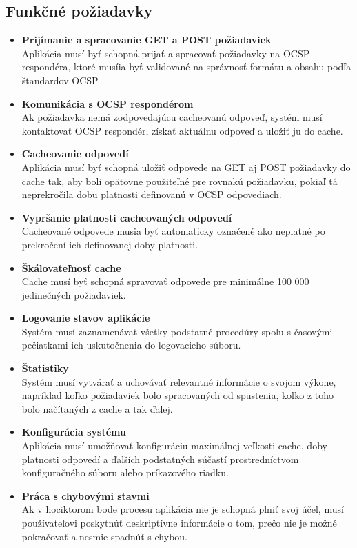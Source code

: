 \documentclass[12pt, twoside]{book}
\begin{document}
\subsection{Funkčné požiadavky}

\begin{itemize}
\item \textbf{Prijímanie a spracovanie  GET a POST požiadaviek} \\
Aplikácia  musí byť schopná prijať a spracovať požiadavky na OCSP respondéra, ktoré musíia byť validované na správnosť formátu a obsahu podľa štandardov OCSP. 

\item \textbf{Komunikácia s OCSP respondérom} \\
Ak požiadavka nemá zodpovedajúcu cacheovanú odpoveď, systém musí kontaktovať OCSP respondér, získať aktuálnu odpoveď a uložiť ju do cache.

\item \textbf{Cacheovanie odpovedí} \\
Aplikácia musí byť schopná uložiť odpovede na GET aj POST požiadavky do cache tak, aby boli opätovne použiteľné pre rovnakú požiadavku, pokiaľ tá neprekročila dobu platnosti definovanú v OCSP odpovediach.

\item \textbf{Vypršanie platnosti cacheovaných odpovedí} \\
Cacheované odpovede musia byť automaticky označené ako neplatné po prekročení ich definovanej doby platnosti.

\item \textbf{Škálovateľnosť cache} \\
Cache musí byť schopná spravovať odpovede pre minimálne 100 000 jedinečných požiadaviek.

\item \textbf{Logovanie stavov aplikácie} \\
Systém musí zaznamenávať všetky podstatné procedúry spolu s časovými pečiatkami ich uskutočnenia do logovacieho súboru.

\item \textbf{Štatistiky} \\
Systém musí vytvárať a uchovávať relevantné informácie o svojom výkone, napríklad koľko požiadaviek bolo spracovaných od spustenia, koľko z toho bolo načítaných z cache a tak ďalej.

\item \textbf{Konfigurácia systému} \\
Aplikácia musí umožňovať konfiguráciu maximálnej veľkosti cache, doby platnosti odpovedí a ďalších podstatných súčastí prostredníctvom konfiguračného súboru alebo príkazového riadku.

\item \textbf{Práca s chybovými stavmi} \\
Ak v hociktorom bode procesu aplikácia nie je schopná plniť svoj účel, musí používateľovi poskytnúť deskriptívne informácie o tom, prečo nie je možné pokračovať a nesmie spadnúť s chybou.
\end{itemize}
\end{document}
